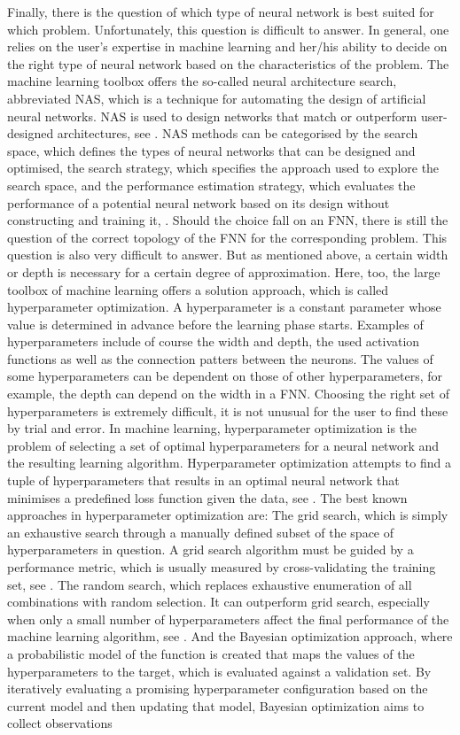 Finally, there is the question of which type of neural network is best suited for which problem. Unfortunately, this question is difficult to answer. In general, one relies on the user's expertise in machine learning and her/his ability to decide on the right type of neural network based on the characteristics of the problem. The machine learning toolbox offers the so-called neural architecture search, abbreviated NAS, which is a technique for automating the design of artificial neural networks. NAS is used to design networks that match or outperform user-designed architectures, see \cite{ZophLe:2017}. NAS methods can be categorised by the search space, which defines the types of neural networks that can be designed and optimised, the search strategy, which specifies the approach used to explore the search space, and the performance estimation strategy, which evaluates the performance of a potential neural network based on its design without constructing and training it, \cite{ElskenMetzenHutter:2019}. Should the choice fall on an FNN, there is still the question of the correct topology of the FNN for the corresponding problem. This question is also very difficult to answer. But as mentioned above, a certain width or depth is necessary for a certain degree of approximation. Here, too, the large toolbox of machine learning offers a solution approach, which is called hyperparameter optimization. A hyperparameter is a constant parameter whose value is determined in advance before the learning phase starts. Examples of hyperparameters include of course the width and depth, the used activation functions as well as the connection patters between the neurons. The values of some hyperparameters can be dependent on those of other hyperparameters, for example, the depth can depend on the width in a FNN. Choosing the right set of hyperparameters is extremely difficult, it is not unusual for the user to find these by trial and error. In machine learning, hyperparameter optimization is the problem of selecting a set of optimal hyperparameters for a neural network and the resulting learning algorithm. Hyperparameter optimization attempts to find a tuple of hyperparameters that results in an optimal neural network that minimises a predefined loss function given the data, see \cite{ClaesenDeMoor:2015}. The best known approaches in hyperparameter optimization are: The grid search, which is simply an exhaustive search through a manually defined subset of the space of hyperparameters in question. A grid search algorithm must be guided by a performance metric, which is usually measured by cross-validating the training set, see \cite{HsuChangLin:2003}. The random search, which replaces exhaustive enumeration of all combinations with random selection. It can outperform grid search, especially when only a small number of hyperparameters affect the final performance of the machine learning algorithm, see \cite{BergstraBengio:2012}. And the Bayesian optimization approach, where a probabilistic model of the function is created that maps the values of the hyperparameters to the target, which is evaluated against a validation set. By iteratively evaluating a promising hyperparameter configuration based on the current model and then updating that model, Bayesian optimization aims to collect observations 